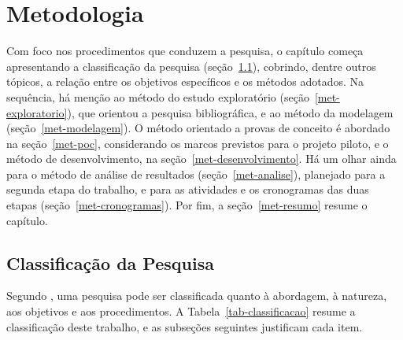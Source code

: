 
\chapter{Metodologia}
\label{cap-metodologia}

Com foco nos procedimentos que conduzem a pesquisa, o capítulo começa apresentando a classificação da pesquisa (seção~\ref{met-classificacao}), cobrindo, dentre outros tópicos, a relação entre os objetivos específicos e os métodos adotados. Na sequência, há menção ao método do estudo exploratório (seção~\ref{met-exploratorio}), que orientou a pesquisa bibliográfica, e ao método da modelagem (seção~\ref{met-modelagem}). O método orientado a provas de conceito é abordado na seção~\ref{met-poc}, considerando os marcos previstos para o projeto piloto, e o método de desenvolvimento, na seção~\ref{met-desenvolvimento}. Há um olhar ainda para o método de análise de resultados (seção~\ref{met-analise}), planejado para a segunda etapa do trabalho, e para as atividades e os cronogramas das duas etapas (seção~\ref{met-cronogramas}). Por fim, a seção~\ref{met-resumo} resume o capítulo.

\section{Classificação da Pesquisa}
\label{met-classificacao}

Segundo , uma pesquisa pode ser classificada quanto à abordagem, à natureza, aos objetivos e aos procedimentos. A Tabela~\ref{tab-classificacao} resume a classificação deste trabalho, e as subseções seguintes justificam cada item.

